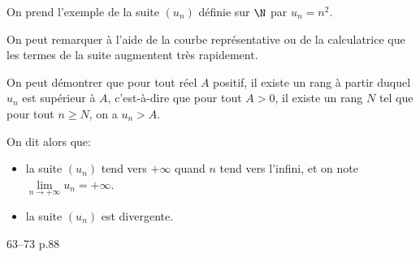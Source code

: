 \documentclass[a4paper]{article}
\begin{document}
    On prend l'exemple de la suite $(u_n)$ définie sur $\N$ par $u_n=n^2$.

    \begin{center}

    \end{center}

    On peut remarquer à l'aide de la courbe représentative ou de la calculatrice que les termes de la suite augmentent très rapidement.

    On peut démontrer que pour tout réel $A$ positif, il existe un rang à partir duquel $u_n$ est supérieur à $A$, c'est-à-dire que pour tout $A>0$, il existe un rang $N$ tel que pour tout $n\geq N$, on a $u_n>A$.

    On dit alors que:
    
    \begin{itemize}[label=\textbullet]
      \item la suite $(u_n)$ tend vers $+\infty$ quand $n$ tend vers l'infini, et on note $\lim\limits_{n\to +\infty}u_n=+\infty$.
      \item la suite $(u_n)$ est divergente.
    \end{itemize}

    \begin{exercices}{}{}
      63--73 p.88
    \end{exercices}
\end{document}
